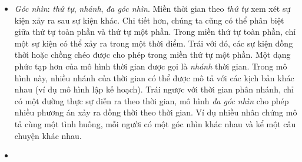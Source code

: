 \begin{itemize}
    \item \textit{Góc nhìn}: \textit{thứ tự}, \textit{nhánh}, \textit{đa góc nhìn}. Miền thời gian theo \textit{thứ tự} xem xét sự kiện xảy ra sau sự kiện khác. Chi tiết hơn, chúng ta cũng có thể phân biệt giữa thứ tự toàn phần và thứ tự một phần. Trong miền thứ tự toàn phần, chỉ một sự kiện có thể xảy ra trong một thời điểm. Trái với đó, các sự kiện đồng thời hoặc chồng chéo được cho phép trong miền thứ tự một phần. Một dạng phức tạp hơn của mô hình thời gian được gọi là \textit{nhánh} thời gian. Trong mô hình này, nhiều nhánh của thời gian có thể được mô tả với các kịch bản khác nhau (ví dụ mô hình lập kế hoạch). Trái ngược với thời gian phân nhánh, chỉ có một đường thực sự diễn ra theo thời gian, mô hình \textit{đa góc nhìn} cho phép nhiều phương án xảy ra đồng thời theo thời gian. Ví dụ nhiều nhân chứng mô tả cùng một tình huống, mỗi người có một góc nhìn khác nhau và kể một câu chuyện khác nhau.
    \item 
\end{itemize}